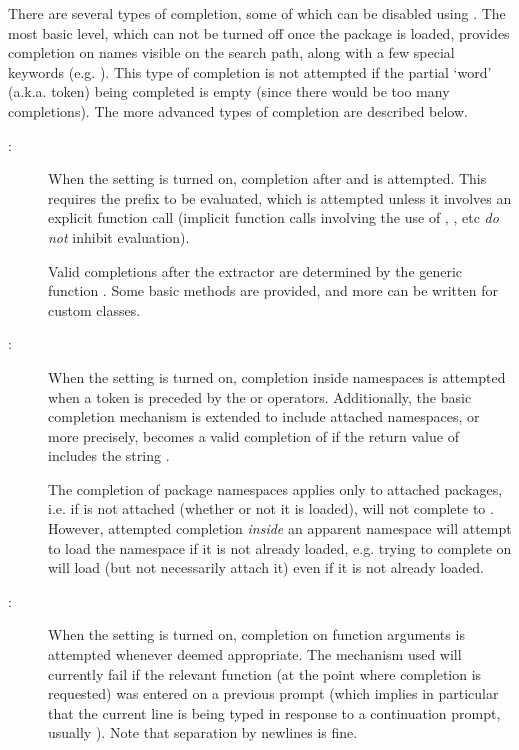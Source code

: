 \begin{Details}\relax
There are several types of completion, some of which can be disabled
using .  The most basic level, which can not be
turned off once the package is loaded, provides completion on names
visible on the search path, along with a few special keywords
(e.g. ).  This type of completion is not attempted if the
partial `word' (a.k.a. token) being completed is empty (since
there would be too many completions).  The more advanced types of
completion are described below.

\begin{description}


\item[:] 
When the  setting is turned on, completion after
\code{\$} and  is attempted.  This requires the prefix to
be evaluated, which is attempted unless it involves an explicit
function call (implicit function calls involving the use of
\code{[}, \code{\$}, etc \emph{do not} inhibit evaluation).

Valid completions after the \code{\$} extractor are determined by
the generic function .  Some basic methods are
provided, and more can be written for custom classes.


\item[:] 
When the  setting is turned on, completion inside
namespaces is attempted when a token is preceded by the \code{::}
or \code{:::} operators.  Additionally, the basic completion
mechanism is extended to include attached namespaces, or more
precisely,  becomes a valid completion of
 if the return value of  includes
the string .

The completion of package namespaces applies only to attached
packages, i.e. if  is not attached (whether or not it
is loaded),  will not complete to .
However, attempted completion \emph{inside} an apparent namespace
will attempt to load the namespace if it is not already loaded,
e.g. trying to complete on  will load 
(but not necessarily attach it) even if it is not already loaded.


\item[:] 
When the  setting is turned on, completion on function
arguments is attempted whenever deemed appropriate.  The mechanism
used will currently fail if the relevant function (at the point
where completion is requested) was entered on a previous prompt
(which implies in particular that the current line is being typed
in response to a continuation prompt, usually \code{+}).  Note
that separation by newlines is fine.


\end{description}
\end{Details}
